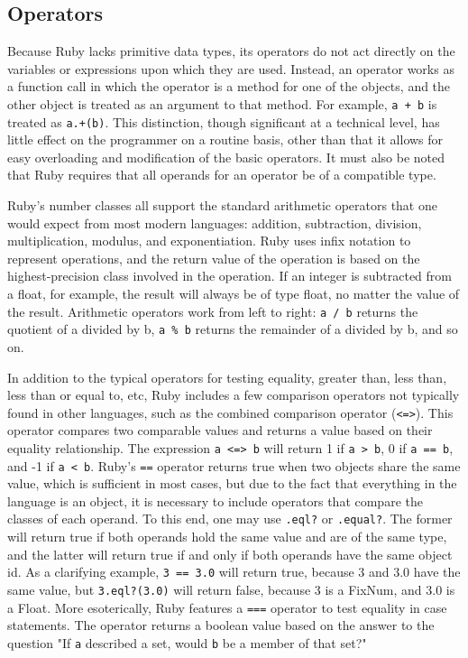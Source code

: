 \documentclass[12pt]{article}
\begin{document}
\subsection{Operators}
Because Ruby lacks primitive data types, its operators do not act directly on the variables or expressions upon which they are used. Instead, an operator works as a function call in which the operator is a method for one of the objects, and the other object is treated as an argument to that method. For example, \verb|a + b| is treated as \verb|a.+(b)|. This distinction, though significant at a technical level, has little effect on the programmer on a routine basis, other than that it allows for easy overloading and modification of the basic operators. It must also be noted that Ruby requires that all operands for an operator be of a compatible type\cite{opstut}.

Ruby's number classes all support the standard arithmetic operators that one would expect from most modern languages: addition, subtraction, division, multiplication, modulus, and exponentiation. Ruby uses infix notation to represent operations, and the return value of the operation is based on the highest-precision class involved in the operation. If an integer is subtracted from a float, for example, the result will always be of type float, no matter the value of the result. Arithmetic operators work from left to right: \verb|a / b| returns the quotient of a divided by b, \verb|a % b| returns the remainder of a divided by b, and so on\cite{opstut}.

In addition to the typical operators for testing equality, greater than, less than, less than or equal to, etc, Ruby includes a few comparison operators not typically found in other languages, such as the combined comparison operator (\verb|<=>|). This operator compares two comparable values and returns a value based on their equality relationship. The expression \verb|a <=> b| will return 1 if \verb|a > b|, 0 if \verb|a == b|, and -1 if \verb|a < b|. Ruby's \verb|==| operator returns true when two objects share the same value, which is sufficient in most cases, but due to the fact that everything in the language is an object, it is necessary to include operators that compare the classes of each operand. To this end, one may use \verb|.eql?| or \verb|.equal?|. The former will return true if both operands hold the same value and are of the same type, and the latter will return true if and only if both operands have the same object id. As a clarifying example, \verb|3 == 3.0| will return true, because 3 and 3.0 have the same value, but \verb|3.eql?(3.0)| will return false, because 3 is a FixNum, and 3.0 is a Float. More esoterically, Ruby features a \verb|===| operator to test equality in case statements. The operator returns a boolean value based on the answer to the question "If \verb|a| described a set, would \verb|b| be a member of that set?"\cite{opstut}\cite{mittag}
\end{document}
